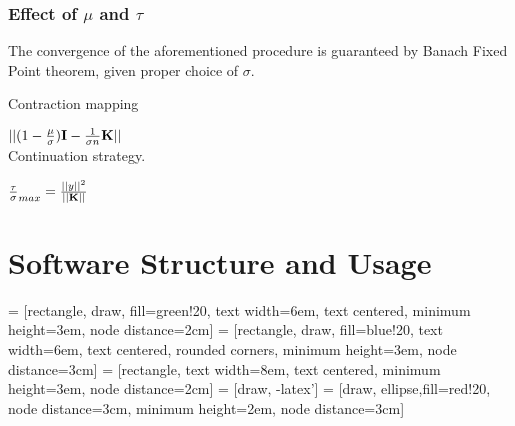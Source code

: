 \documentclass[tablecaption=bottom,wcp]{jmlr} %
\begin{document}
\subsubsection{Effect of $\mu$ and $\tau$}
The convergence of the aforementioned procedure is guaranteed by Banach Fixed Point theorem, given proper choice of $\sigma$. 

\citet{Zou-2005}

\citet{rosasco-prox-2009}


Contraction mapping

$||(1 - \frac{\mu}{\sigma}){\bf I} - \frac{1}{\sigma n} {\bf K} ||$\\

Continuation strategy.

$\frac{\tau}{\sigma}_{max} = \frac{||y||^2}{||{\bf K}||}$



\section{Software Structure and Usage}

 = [rectangle, draw, fill=green!20, 
    text width=6em, text centered, minimum height=3em, 
    node distance=2cm]
 = [rectangle, draw, fill=blue!20, 
    text width=6em, text centered, rounded corners, minimum height=3em, node distance=3cm]
 = [rectangle, 
    text width=8em, text centered, minimum height=3em,
    node distance=2cm]    
 = [draw, -latex']
 = [draw, ellipse,fill=red!20, node distance=3cm,
    minimum height=2em, node distance=3cm]
\end{document}
